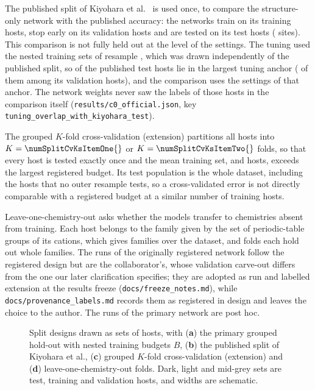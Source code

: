 The published split of Kiyohara et al.\ \citep{Kiyohara2025machinelearning} is used once, to compare the
structure-only network with the published accuracy: the networks train on its
\numFilterCascadeKiyoharaSplitHostsTrain{} training hosts, stop early on its \numFilterCascadeKiyoharaSplitHostsVal{}
validation hosts and are tested on its \numFilterCascadeKiyoharaSplitHostsTest{} test hosts
(\numFilterCascadeKiyoharaSplitSitesTest{} sites). This comparison is not fully held out at the level of the
settings. The tuning used the nested training sets of resample \numCfgTuningAnchorResample{}, which was drawn
independently of the published split, so \numCZeroOfficialTuningOverlapWithKiyoharaTestSixHundredFiftyFourInKiyoharaTest{}
of the published test hosts lie in the largest tuning anchor
(\numCZeroOfficialTuningOverlapWithKiyoharaTestSixHundredFiftyFourOfWhichValidationHosts{} of them among its
validation hosts), and the comparison uses the settings of that anchor. The network weights never saw the labels
of those hosts in the comparison itself (\texttt{results/c0\_official.json}, key
\texttt{tuning\_overlap\_with\_kiyohara\_test}).

The grouped $K$-fold cross-validation (extension) partitions all \numSplitCvNHosts{} hosts into
$K = \numSplitCvKsItemOne{}$ or $K = \numSplitCvKsItemTwo{}$ folds, so that every host is tested exactly once and the
mean training set, \numCvGOneVOneXTrainingHostsKTen{} and \numCvGOneVOneXTrainingHostsKTwenty{} hosts, exceeds the
largest registered budget. Its test population is the whole dataset, including the
\numSplitMetaCoverageNeverInTest{} hosts that no outer resample tests, so a cross-validated error is not directly
comparable with a registered budget at a similar number of training hosts.

Leave-one-chemistry-out asks whether the models transfer to chemistries absent from training. Each host belongs to
the family given by the set of periodic-table groups of its cations, which gives \numSplitLocoNFamilies{} families
over the dataset, and \numSplitLocoNFolds{} folds each hold out whole families. The runs of the originally
registered network follow the registered design but are the collaborator's, whose validation carve-out differs
from the one our later clarification specifies; they are adopted as run and labelled extension at the results
freeze (\texttt{docs/freeze\_notes.md}), while \texttt{docs/provenance\_labels.md} records them as registered in
design and leaves the choice to the author. The runs of the primary network are post hoc.

\begin{figure}[htbp]
\centering
{}
\caption{Split designs drawn as sets of hosts, with (\textbf{a}) the primary grouped hold-out with nested training budgets
$B$, (\textbf{b}) the published split of Kiyohara et al., (\textbf{c}) grouped $K$-fold cross-validation
(extension) and (\textbf{d}) leave-one-chemistry-out folds. Dark, light and mid-grey sets are test, training and
validation hosts, and widths are schematic.}
\label{fig:splits}
\end{figure}
\FloatBarrier

